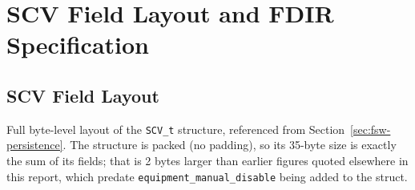 \chapter{SCV Field Layout and FDIR Specification}
\label{app:fsw-fdir}

\section{SCV Field Layout}

Full byte-level layout of the \texttt{SCV\_t} structure, referenced from
Section~\ref{sec:fsw-persistence}. The structure is packed (no padding),
so its 35-byte size is exactly the sum of its fields; that is 2 bytes
larger than earlier figures quoted elsewhere in this report, which predate
\texttt{equipment\_manual\_disable} being added to the struct.

